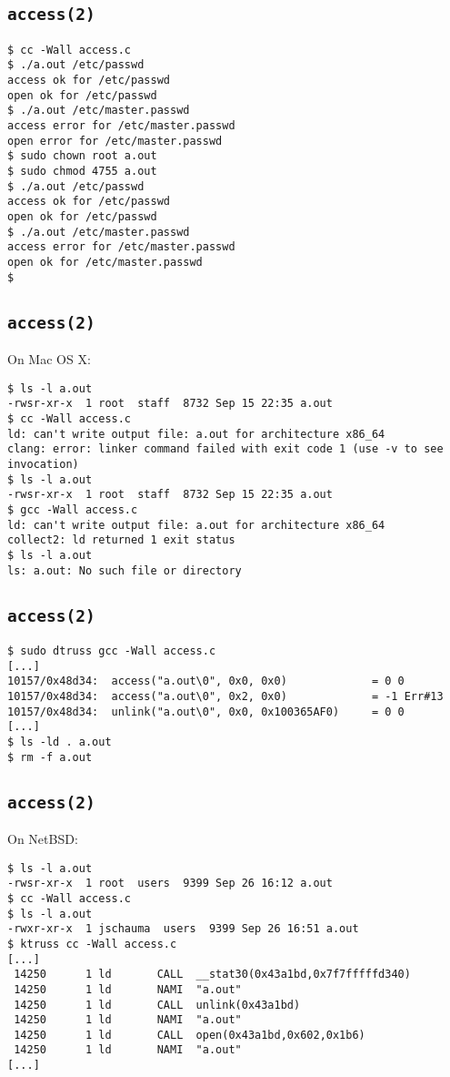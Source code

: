 \documentclass[xga]{xdvislides}
\begin{document}
\subsection{{\tt access(2)}}
\begin{verbatim}
$ cc -Wall access.c
$ ./a.out /etc/passwd
access ok for /etc/passwd
open ok for /etc/passwd
$ ./a.out /etc/master.passwd
access error for /etc/master.passwd
open error for /etc/master.passwd
$ sudo chown root a.out
$ sudo chmod 4755 a.out
$ ./a.out /etc/passwd
access ok for /etc/passwd
open ok for /etc/passwd
$ ./a.out /etc/master.passwd
access error for /etc/master.passwd
open ok for /etc/master.passwd
$
\end{verbatim}

\subsection{{\tt access(2)}}
On Mac OS X:
\begin{verbatim}
$ ls -l a.out
-rwsr-xr-x  1 root  staff  8732 Sep 15 22:35 a.out
$ cc -Wall access.c
ld: can't write output file: a.out for architecture x86_64
clang: error: linker command failed with exit code 1 (use -v to see invocation)
$ ls -l a.out
-rwsr-xr-x  1 root  staff  8732 Sep 15 22:35 a.out
$ gcc -Wall access.c
ld: can't write output file: a.out for architecture x86_64
collect2: ld returned 1 exit status
$ ls -l a.out
ls: a.out: No such file or directory
\end{verbatim}

\subsection{{\tt access(2)}}
\begin{verbatim}
$ sudo dtruss gcc -Wall access.c
[...]
10157/0x48d34:  access("a.out\0", 0x0, 0x0)             = 0 0
10157/0x48d34:  access("a.out\0", 0x2, 0x0)             = -1 Err#13
10157/0x48d34:  unlink("a.out\0", 0x0, 0x100365AF0)     = 0 0
[...]
$ ls -ld . a.out
$ rm -f a.out
\end{verbatim}


\subsection{{\tt access(2)}}
On NetBSD:
\begin{verbatim}
$ ls -l a.out
-rwsr-xr-x  1 root  users  9399 Sep 26 16:12 a.out
$ cc -Wall access.c
$ ls -l a.out
-rwxr-xr-x  1 jschauma  users  9399 Sep 26 16:51 a.out
$ ktruss cc -Wall access.c
[...]
 14250      1 ld       CALL  __stat30(0x43a1bd,0x7f7fffffd340)
 14250      1 ld       NAMI  "a.out"
 14250      1 ld       CALL  unlink(0x43a1bd)
 14250      1 ld       NAMI  "a.out"
 14250      1 ld       CALL  open(0x43a1bd,0x602,0x1b6)
 14250      1 ld       NAMI  "a.out"
[...]
\end{verbatim}
\end{document}

